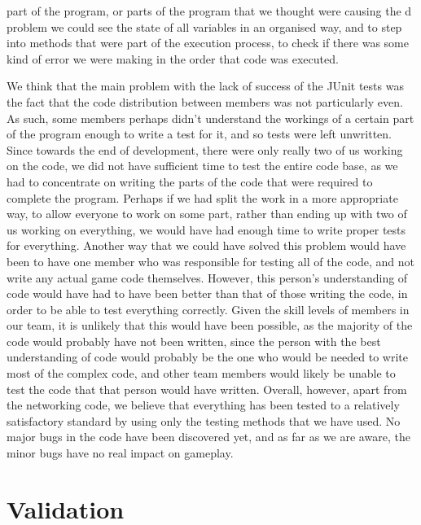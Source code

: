 part of the program, or parts of the program that we thought were causing the d problem we could see the state of all variables in an organised way, and to step into methods that were part of the execution process, to check if there was some kind of error we were making in the order that code was executed.

We think that the main problem with the lack of success of the JUnit tests was the fact that the code distribution between members was not particularly even. As such, some members perhaps didn't understand the workings of a certain part of the program enough to write a test for it, and so tests were left unwritten. Since towards the end of development, there were only really two of us working on the code, we did not have sufficient time to test the entire code base, as we had to concentrate on writing the parts of the code that were required to complete the program. Perhaps if we had split the work in a more appropriate way, to allow everyone to work on some part, rather than ending up with two of us working on everything, we would have had enough time to write proper tests for everything. Another way that we could have solved this problem would have been to have one member who was responsible for testing all of the code, and not write any actual game code themselves. However, this person's understanding of code would have had to have been better than that of those writing the code, in order to be able to test everything correctly. Given the skill levels of members in our team, it is unlikely that this would have been possible, as the majority of the code would probably have not been written, since the person with the best understanding of code would probably be the one who would be needed to write most of the complex code, and other team members would likely be unable to test the code that that person would have written. Overall, however, apart from the networking code, we believe that everything has been tested to a relatively satisfactory standard by using only the testing methods that we have used. No major bugs in the code have been discovered yet, and as far as we are aware, the minor bugs have no real impact on gameplay.
\section{Validation}
